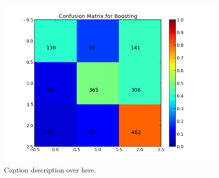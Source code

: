 \begin{figure}[H]
 \begin{center}
     \includegraphics[width=0.7\linewidth]{../img/plots/grid/confusion_matrix_Boosting.png}
 \end{center}
 \caption[Results overview across models]{Caption description over here.}
 \label{fig:confmat_boosting}
\end{figure}






